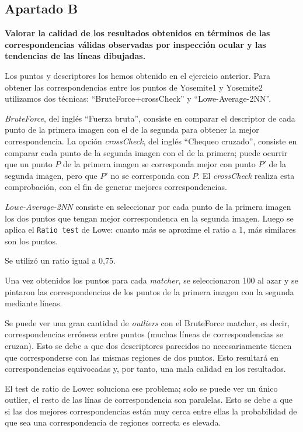 \documentclass[12pt,spanish]{article} %
\begin{document}
\subsection{Apartado B}

\textbf{
Valorar la calidad de los resultados obtenidos en términos de las correspondencias válidas observadas por inspección ocular y las tendencias de las líneas dibujadas.
}

Los puntos y descriptores los hemos obtenido en el ejercicio anterior. Para obtener las correspondencias entre los puntos de Yosemite1 y Yosemite2 utilizamos dos técnicas: ``BruteForce+crossCheck'' y ``Lowe-Average-2NN''.

\textit{BruteForce}, del inglés ``Fuerza bruta'', consiste en comparar el descriptor de cada punto de la primera imagen con el de la segunda para obtener la mejor correspondencia. La opción \textit{crossCheck}, del inglés ``Chequeo cruzado'', consiste en comparar cada punto de la segunda imagen con el de la primera; puede ocurrir que un punto $P$ de la primera imagen se corresponda mejor con punto $P'$ de la segunda imagen, pero que $P'$ no se corresponda con $P$. El \textit{crossCheck} realiza esta comprobación, con el fin de generar mejores correspondencias.

\textit{Lowe-Average-2NN} consiste en seleccionar por cada punto de la primera imagen los dos puntos que tengan mejor correspondenca en la segunda imagen. Luego se aplica el \texttt{Ratio test} de Lowe: cuanto más se aproxime el ratio a 1, más similares son los puntos.

Se utilizó un ratio igual a 0,75.

Una vez obtenidos los puntos para cada \textit{matcher}, se seleccionaron 100 al azar y se pintaron las correspondencias de los puntos de la primera imagen con la segunda mediante líneas.

Se puede ver una gran cantidad de \textit{outliers} con el BruteForce matcher, es decir, correspondencias erróneas entre puntos (muchas líneas de correspondencias se cruzan). Esto se debe a que dos descriptores parecidos no necesariamente tienen que corresponderse con las mismas regiones de dos puntos. Esto resultará en correspondencias equivocadas y, por tanto, una mala calidad en los resultados.

El test de ratio de Lower soluciona ese problema; solo se puede ver un único outlier, el resto de las línas de correspondencia son paralelas. Esto se debe a que si las dos mejores correspondencias están muy cerca entre ellas la probabilidad de que sea una correspondencia de regiones correcta es elevada.
\end{document}
